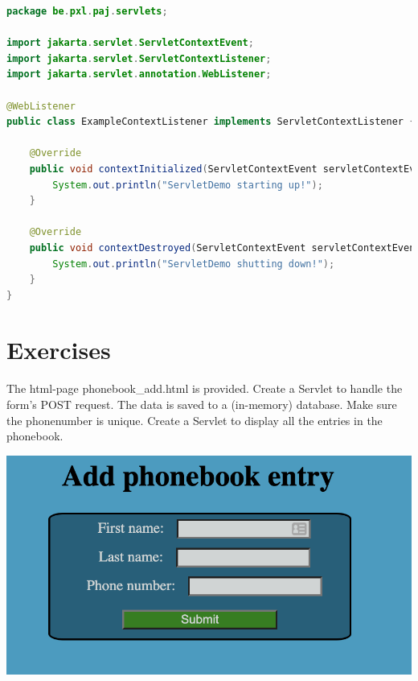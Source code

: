 \begin{lstlisting}[language=java, frame=single]
package be.pxl.paj.servlets;

import jakarta.servlet.ServletContextEvent;
import jakarta.servlet.ServletContextListener;
import jakarta.servlet.annotation.WebListener;

@WebListener
public class ExampleContextListener implements ServletContextListener {

	@Override
	public void contextInitialized(ServletContextEvent servletContextEvent) {
		System.out.println("ServletDemo starting up!");
	}

	@Override
	public void contextDestroyed(ServletContextEvent servletContextEvent) {
		System.out.println("ServletDemo shutting down!");
	}
}
\end{lstlisting}

\section{Exercises}

\begin{oefening}
The html-page phonebook\_add.html is provided. Create a Servlet to handle the form’s POST request. The data is saved to a (in-memory) database. Make sure the phonenumber is unique.  Create a Servlet to display all the entries in the phonebook. 
\end{oefening}

\includegraphics{./images/chapter8/add_phonebook_entry}
